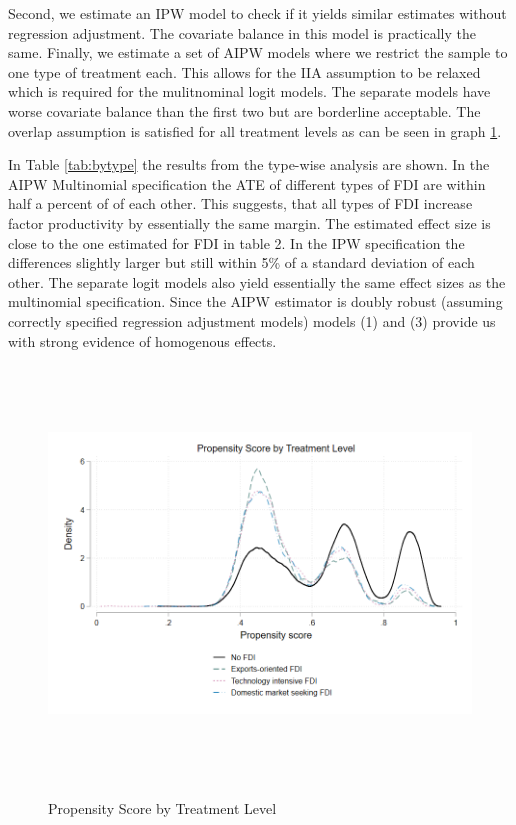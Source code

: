 \documentclass[a4paper,11pt]{scrartcl}
\begin{document}
Second, we estimate an IPW model to check if it yields similar estimates without regression adjustment. The covariate balance in this model is practically the same. Finally, we estimate a set of AIPW models where we restrict the sample to one type of treatment each. This allows for the IIA assumption to be relaxed which is required for the mulitnominal logit models. The separate models have worse covariate balance than the first two but are borderline acceptable. The overlap assumption is satisfied for all treatment levels as can be seen in graph \ref{fig:psbytype}. 


In Table \ref{tab:bytype} the results from the type-wise analysis are shown. In the AIPW Multinomial specification the ATE of different types of FDI are within half a percent of of each other. This suggests, that all types of FDI increase factor productivity by essentially the same margin. The estimated effect size is close to the one estimated for FDI in table 2. In the IPW specification the differences slightly larger but still within 5\% of a standard deviation of each other.  The separate logit models also yield essentially the same effect sizes as the multinomial specification. Since the AIPW estimator is doubly robust (assuming correctly specified regression adjustment models) models (1) and (3) provide us with strong evidence of homogenous effects.


\begin{figure}[h]\centering
\caption{Propensity Score by Treatment Level}
\includegraphics[height=11cm]{mlog_overl_ppb.png}\\[0.5cm] 
\label{fig:psbytype}
\end{figure}
\end{document}
